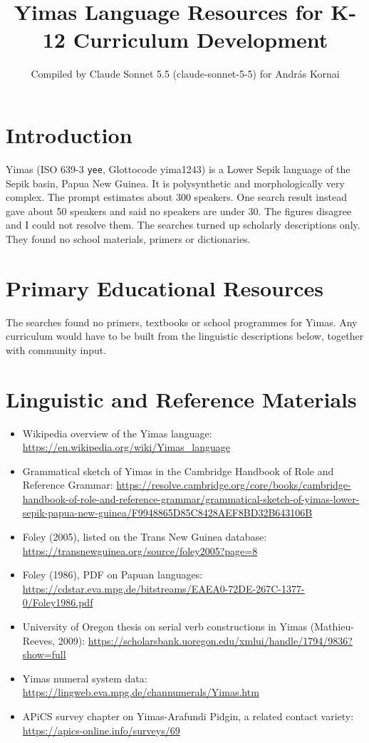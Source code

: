 \documentclass[12pt]{article}
\title{Yimas Language Resources for K-12 Curriculum Development}
\author{Compiled by Claude Sonnet 5.5 (claude-sonnet-5-5) for Andr\'as Kornai}
\date{}
\begin{document}
\maketitle

\section{Introduction}
Yimas (ISO 639-3 \texttt{yee}, Glottocode yima1243) is a Lower Sepik language of the Sepik basin, Papua New Guinea. It is polysynthetic and morphologically very complex. The prompt estimates about 300 speakers. One search result instead gave about 50 speakers and said no speakers are under 30. The figures disagree and I could not resolve them. The searches turned up scholarly descriptions only. They found no school materials, primers or dictionaries.

\section{Primary Educational Resources}
The searches found no primers, textbooks or school programmes for Yimas. Any curriculum would have to be built from the linguistic descriptions below, together with community input.

\section{Linguistic and Reference Materials}
\begin{itemize}
\item Wikipedia overview of the Yimas language: \url{https://en.wikipedia.org/wiki/Yimas_language}
\item Grammatical sketch of Yimas in the Cambridge Handbook of Role and Reference Grammar: \url{https://resolve.cambridge.org/core/books/cambridge-handbook-of-role-and-reference-grammar/grammatical-sketch-of-yimas-lower-sepik-papua-new-guinea/F9948865D85C8428AEF8BD32B643106B}
\item Foley (2005), listed on the Trans New Guinea database: \url{https://transnewguinea.org/source/foley2005?page=8}
\item Foley (1986), PDF on Papuan languages: \url{https://cdstar.eva.mpg.de/bitstreams/EAEA0-72DE-267C-1377-0/Foley1986.pdf}
\item University of Oregon thesis on serial verb constructions in Yimas (Mathieu-Reeves, 2009): \url{https://scholarsbank.uoregon.edu/xmlui/handle/1794/9836?show=full}
\item Yimas numeral system data: \url{https://lingweb.eva.mpg.de/channumerals/Yimas.htm}
\item APiCS survey chapter on Yimas-Arafundi Pidgin, a related contact variety: \url{https://apics-online.info/surveys/69}
\end{itemize}
\end{document}
